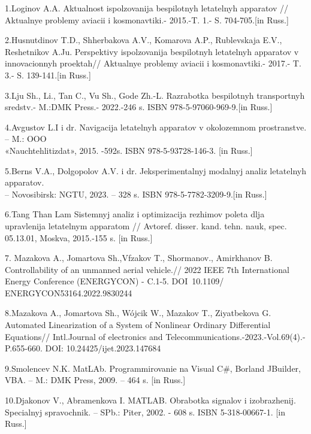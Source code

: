\begin{noparindent}

1.Loginov A.A. Aktual\textquotesingle nost\textquotesingle{}
ispol\textquotesingle zovanija bespilotnyh letatel\textquotesingle nyh
apparatov // Aktual\textquotesingle nye problemy aviacii i
kosmonavtiki.- 2015.-T. 1.- S. 704-705.{[}in Russ.{]}

2.Husnutdinov T.D., Shherbakova A.V., Komarova A.P., Rublevskaja E.V.,
Reshetnikov A.Ju. Perspektivy ispol\textquotesingle zovanija bespilotnyh
letatel\textquotesingle nyh apparatov v innovacionnyh proektah//
Aktual\textquotesingle nye problemy aviacii i kosmonavtiki.- 2017.- T.
3.- S. 139-141.{[}in Russ.{]}

3.Lju Sh., Li., Tan C., Vu Sh., God\textquotesingle e Zh.-L. Razrabotka
bespilotnyh transportnyh sredstv.- M.:DMK Press.- 2022.-246 s. ISBN
978-5-97060-969-9.{[}in Russ.{]}

4.Avgustov L.I i dr. Navigacija letatel\textquotesingle nyh apparatov v
okolozemnom prostranstve. -- M.: OOO \\«Nauchtehlitizdat», 2015. -592s.
ISBN 978-5-93728-146-3. {[}in Russ.{]}

5.Berns V.A., Dolgopolov A.V. i dr. Jeksperimental\textquotesingle nyj
modal\textquotesingle nyj analiz letatel\textquotesingle nyh apparatov.
\\-- Novosibirsk: NGTU, 2023. -- 328 s. ISBN 978-5-7782-3209-9.{[}in
Russ.{]}

6.Tang Than\textquotesingle{} Lam Sistemnyj analiz i optimizacija
rezhimov poleta dlja upravlenija letatel\textquotesingle nym apparatom
// Avtoref. disser. kand. tehn. nauk, spec. 05.13.01, Moskva, 2015.-155
s. {[}in Russ.{]}

7. Mazakova A., Jomartova Sh.,Vfzakov T., Shormanov., Amirkhanov B.
Controllability of an unmanned aerial vehicle.// 2022 IEEE 7th
International Energy Conference (ENERGYCON) - C.1-5.
DOI~10.1109/\\ENERGYCON53164.2022.9830244

8.Mazakova A., Jomartova Sh., Wójcik W., Mazakov T., Ziyatbekova G.
Automated Linearization of a System of Nonlinear Ordinary Differential
Equations// Intl.Journal of electronics and Telecommunications.-2023.-Vol.69(4).- P.655-660. DOI:
10.24425/ijet.2023.147684

9.Smolencev N.K. MatLAb. Programmirovanie na Visual C\#, Borland
JBuilder, VBA. -- M.: DMK Press, 2009. -- 464 s. {[}in Russ.{]}

10.D\textquotesingle jakonov V., Abramenkova I. MATLAB. Obrabotka
signalov i izobrazhenij. Special\textquotesingle nyj spravochnik. --
SPb.: Piter, 2002. - 608 s. ISBN 5-318-00667-1. {[}in Russ.{]}


\end{noparindent}
